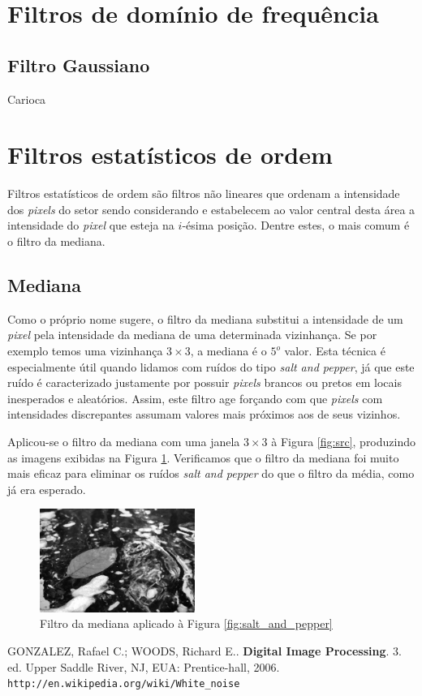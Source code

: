 \documentclass[10pt,a4paper]{article}
\newcommand{\pixel}{\textit{pixel} }
\newcommand{\pixels}{\textit{pixels} }
\begin{document}
\section{Filtros de domínio de frequência}
\subsection{Filtro Gaussiano}
Carioca

\section{Filtros estatísticos de ordem}
Filtros estatísticos de ordem são filtros não lineares que ordenam a intensidade dos \pixels do setor sendo considerando e estabelecem ao valor central desta área a intensidade do \pixel que esteja na $i$-ésima posição. Dentre estes, o mais comum é o filtro da mediana.

\subsection{Mediana}
Como o próprio nome sugere, o filtro da mediana substitui a intensidade de um \pixel pela intensidade da mediana de uma determinada vizinhança. Se por exemplo temos uma vizinhança $3\times3$, a mediana é o $5^o$ valor. Esta técnica é especialmente útil quando lidamos com ruídos do tipo \textit{salt and pepper}, já que este ruído é caracterizado justamente por possuir \pixels brancos ou pretos em locais inesperados e aleatórios. Assim, este filtro age forçando com que \pixels com intensidades discrepantes assumam valores mais próximos aos de seus vizinhos.

Aplicou-se o filtro da mediana com uma janela $3 \times 3$ à Figura \ref{fig:src}, produzindo as imagens exibidas na Figura \ref{fig:median_filter}. Verificamos que o filtro da mediana foi muito mais eficaz para eliminar os ruídos \textit{salt and pepper} do que o filtro da média, como já era esperado.

\begin{figure}[!ht]
    \centering
    \includegraphics[width=0.45\textwidth]{dst_sp_median.jpg}
    \caption{Filtro da mediana aplicado à Figura \ref{fig:salt_and_pepper}}
    \label{fig:median_filter}
\end{figure}

\begin{thebibliography}{99}
     GONZALEZ, Rafael C.; WOODS, Richard E.. \textbf{Digital Image Processing}. 3. ed. Upper Saddle River, NJ, EUA: Prentice-hall, 2006.
     \texttt{http://en.wikipedia.org/wiki/White\_noise}
\end{thebibliography}
\end{document}
